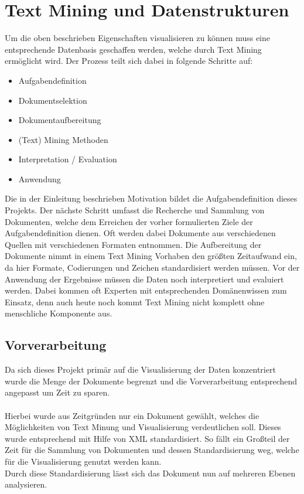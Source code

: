 \newpage
\section{Text Mining und Datenstrukturen}
Um die oben beschrieben Eigenschaften visualisieren zu k\"onnen muss eine entsprechende Datenbasis geschaffen werden, welche durch Text Mining erm\"oglicht wird. Der Prozess teilt sich dabei in folgende Schritte auf:
\begin{itemize}
\item Aufgabendefinition
\item Dokumentselektion
\item Dokumentaufbereitung
\item (Text) Mining Methoden
\item Interpretation / Evaluation
\item Anwendung
\end{itemize}
Die in der Einleitung beschrieben Motivation bildet die Aufgabendefinition dieses Projekts. Der n\"achste Schritt umfasst die Recherche und Sammlung von Dokumenten, welche dem Erreichen der vorher formulierten Ziele der Aufgabendefinition dienen. Oft werden dabei Dokumente aus verschiedenen Quellen mit verschiedenen Formaten entnommen. Die Aufbereitung der Dokumente nimmt in einem Text Mining Vorhaben den gr\"oßten Zeitaufwand ein, da hier Formate, Codierungen und Zeichen standardisiert werden m\"ussen. Vor der Anwendung der Ergebnisse m\"ussen die Daten noch interpretiert und evaluiert werden. Dabei kommen oft Experten mit entsprechenden Dom\"anenwissen zum Einsatz, denn auch heute noch kommt Text Mining nicht komplett ohne menschliche Komponente aus.

\subsection{Vorverarbeitung}
Da sich dieses Projekt prim\"ar auf die Visualisierung der Daten konzentriert wurde die Menge der Dokumente begrenzt und die Vorverarbeitung entsprechend angepasst um Zeit zu sparen. \\
\\
Hierbei wurde aus Zeitgr\"unden nur ein Dokument gew\"ahlt, welches die M\"oglichkeiten von Text Minung und Visualisierung verdeutlichen soll. Dieses wurde entsprechend mit Hilfe von XML standardisiert. So f\"allt ein Großteil der Zeit f\"ur die Sammlung von Dokumenten und dessen Standardisierung weg, welche f\"ur die Visualisierung genutzt werden kann. \\
Durch diese Standardisierung l\"asst sich das Dokument nun auf mehreren Ebenen analysieren.

